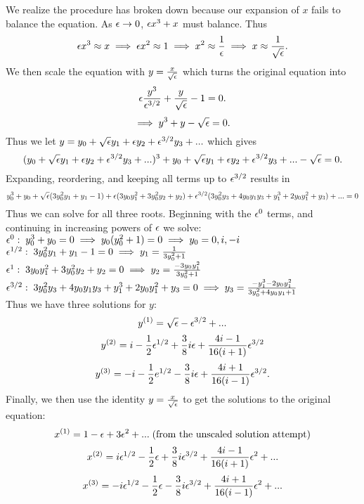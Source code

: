             We realize the procedure has broken down because our expansion of $x$ fails to balance the equation. As $\epsilon\to 0$, $\epsilon x^3+x$ must balance. Thus
            $$\epsilon x^3\approx x\implies \epsilon x^2\approx 1\implies x^2\approx \frac{1}{\epsilon}\implies x\approx\frac{1}{\sqrt{\epsilon}}.$$
            We then scale the equation with $y=\frac{x}{\sqrt{\epsilon}}$ which turns the original equation into
            $$\epsilon\frac{y^3}{\epsilon^{3/2}}+\frac{y}{\sqrt{\epsilon}}-1=0.$$
            $$\implies y^3+y-\sqrt{\epsilon}=0.$$
            Thus we let $y=y_0+\sqrt{\epsilon}y_1+\epsilon y_2+\epsilon^{3/2}y_3+...$ which gives
            $$(y_0+\sqrt{\epsilon}y_1+\epsilon y_2+\epsilon^{3/2}y_3+...)^3+y_0+\sqrt{\epsilon}y_1+\epsilon y_2+\epsilon^{3/2}y_3+...-\sqrt{\epsilon}=0.$$
            Expanding, reordering, and keeping all terms up to $\epsilon^{3/2}$ results in
            $$y_0^3+y_0+\sqrt{\epsilon}(3y_0^2y_1+y_1-1)+\epsilon(3y_0y_1^2+3y_0^2y_2+y_2)+\epsilon^{3/2}(3y_0^2y_3+4y_0y_1y_3+y_1^3+2y_0y_1^2+y_3)+...=0$$
            Thus we can solve for all three roots. Beginning with the $\epsilon^0$ terms, and continuing in increasing powers of $\epsilon$ we solve:\\
            $\epsilon^0: \; y_0^3+y_0=0\implies y_0(y_0^2+1)=0\implies y_0=0,i,-i$\\
            $\epsilon^{1/2}: \; 3y_0^2y_1+y_1-1=0\implies y_1=\frac{1}{3y_0^2+1}$\\
            $\epsilon^1: \; 3y_0y_1^2+3y_0^2y_2+y_2=0\implies y_2=\frac{-3y_0y_1^2}{3y_0^2+1}$\\
            $\epsilon^{3/2}: \; 3y_0^2y_3+4y_0y_1y_3+y_1^3+2y_0y_1^2+y_3=0\implies y_3=\frac{-y_1^3-2y_0y_1^2}{3y_0^2+4y_0y_1+1}$\\
            Thus we have three solutions for $y$:
            $$y^{(1)}=\sqrt{\epsilon}-\epsilon^{3/2}+...$$
            $$y^{(2)}=i-\frac{1}{2}\epsilon^{1/2}+\frac{3}{8}i\epsilon+\frac{4i-1}{16(i+1)}\epsilon^{3/2}$$
            $$y^{(3)}=-i-\frac{1}{2}e^{1/2}-\frac{3}{8}i\epsilon+\frac{4i+1}{16(i-1)}\epsilon^{3/2}.$$
            Finally, we then use the identity $y=\frac{x}{\sqrt{\epsilon}}$ to get the solutions to the original equation:
            $$x^{(1)}=1-\epsilon+3\epsilon^2+...\;\text{(from the unscaled solution attempt)}$$
            $$x^{(2)}=i\epsilon^{1/2}-\frac{1}{2}\epsilon+\frac{3}{8}i\epsilon^{3/2}+\frac{4i-1}{16(i+1)}\epsilon^2+...$$
            $$x^{(3)}=-i\epsilon^{1/2}-\frac{1}{2}\epsilon-\frac{3}{8}i\epsilon^{3/2}+\frac{4i+1}{16(i-1)}\epsilon^2+...$$

